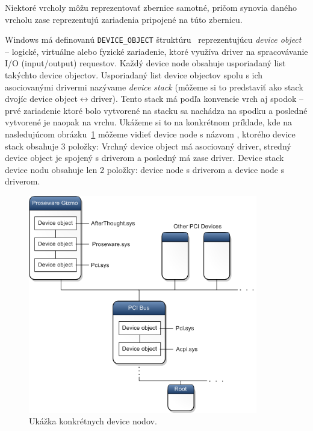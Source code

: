 Niektoré vrcholy môžu reprezentovať zbernice samotné, pričom synovia daného vrcholu zase reprezentujú zariadenia pripojené na túto zbernicu.

Windows má definovanú \texttt{DEVICE\_OBJECT} štruktúru~\cite{usb_msdn_device_object} reprezentujúcu \textit{device object} -- logické, virtuálne alebo fyzické zariadenie, ktoré využíva driver na spracovávanie I/O (input/output) requestov. Každý device node obsahuje usporiadaný list takýchto device objectov.  Usporiadaný list device objectov spolu s ich asociovanými drivermi nazývame \textit{device stack} (môžeme si to predstaviť ako stack dvojíc device object$\leftrightarrow$driver). Tento stack má podľa konvencie vrch aj spodok -- prvé zariadenie ktoré bolo vytvorené na stacku sa nachádza na spodku a posledné vytvorené je naopak na vrchu. Ukážeme si to na konkrétnom príklade, kde na nasledujúcom obrázku~\ref{obr:kap2:device_node_diagram} môžeme vidieť device node s názvom , ktorého device stack obsahuje 3 položky: Vrchný device object má asociovaný  driver, stredný device object je spojený s driverom  a posledný má zase  driver. Device stack  device nodu obsahuje len 2 položky: device node s  driverom a device node s  driverom.

\begin{figure}[!htb]
	\centering
	\includegraphics[width=10cm]{img/kap02_device_node_diagram}
	\caption{Ukážka konkrétnych device nodov.}
	\label{obr:kap2:device_node_diagram}
\end{figure}

